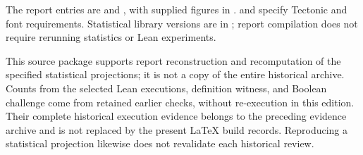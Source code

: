\begin{description}[leftmargin=1.2em,style=nextline]
\item[Build and statistical requirements.] The report entries are  and , with supplied figures in .  and  specify Tectonic and font requirements. Statistical library versions are in ; report compilation does not require rerunning statistics or Lean experiments.
\end{description}
\endgroup

This source package supports report reconstruction and recomputation of the specified statistical projections; it is not a copy of the entire historical archive. Counts from the selected Lean executions, definition witness, and Boolean challenge come from retained earlier checks, without re-execution in this edition. Their complete historical execution evidence belongs to the preceding evidence archive and is not replaced by the present LaTeX build records. Reproducing a statistical projection likewise does not revalidate each historical review.
